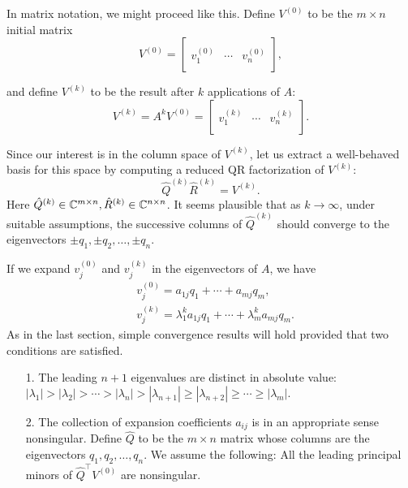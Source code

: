 In matrix notation, we might proceed like this. Define $V^{(0)}$ to be the $m\times n$ initial matrix 
\begin{equation}
\label{eq: sim iter v0}
    V^{(0)} = \left[ \begin{array}{c|c|c}
        & &\\ 
        v_1^{(0)}& \cdots & v_n^{(0)} \\ 
        & & 
    \end{array} \right] ,
\end{equation}

and define $V^{(k)}$ to be the result after $k$ applications of $A$: 
\begin{equation}
\label{eq: sim iter vk}
        V^{(k)} = A^{k}V^{(0)}= \left[ \begin{array}{c|c|c}
        & & \\ 
        v_1^{(k)} & \cdots & v_n^{(k)} \\ 
        & &         
    \end{array} \right].  
\end{equation}

Since our interest is in the column space of $V^{(k)}$, let us extract a well-behaved basis for this space by computing a reduced QR factorization of $V^{(k)}$: 
\begin{equation}
\label{eq: Qr sim iter k}
    \hat Q ^{(k)} \hat R ^{(k)}= V^{(k)}. 
\end{equation}
Here $\hat Q ^{(k)}\in \mathbb{C}^{m \times n}, \hat R ^{(k)}\in \mathbb{C}^{n \times n}$.  It seems plausible that as $k\to \infty$, under suitable assumptions, the successive columns of $ \hat Q ^{(k)} $ should converge to the eigenvectors $ \pm q_1, \pm q_2,\ldots , \pm q_n $.  

If we expand $v_j^{(0)}$ and $v_j^{(k)}$ in the eigenvectors of $A$, we have 
\begin{align*}
    &v_j^{(0)} = a_{1j} q_1 + \cdots + a_{mj}q_m, \\ 
    &v_j^{(k)} = \lambda _1^{k}a_{1j} q_1 + \cdots + \lambda _m^{k}a_{mj} q_m.  
\end{align*}
As in the last section, simple convergence results will hold provided that two conditions are satisfied. 
\begin{itemize}
    \item [1.] The leading $n+1$ eigenvalues are distinct in absolute value: $ |\lambda _1 | > |\lambda _2| > \cdots > |\lambda _n| > |\lambda _{n+1}| \ge |\lambda _{n+2} | \ge \cdots \ge |\lambda _m|.  $
    \item [2.] The collection of expansion coefficients $a_{ij}$ is in an appropriate sense nonsingular. Define $\hat Q$ to be the $ m \times n$ matrix whose columns are the eigenvectors $ q_1, q_2,\ldots ,q_n $. We assume the following: All the leading principal minors of $ \hat Q ^\top  V^{(0)} $ are nonsingular. 
\end{itemize}

